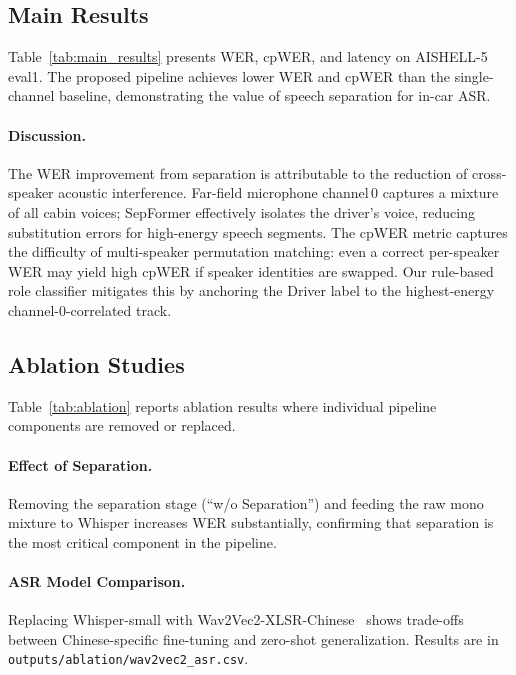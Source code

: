 \subsection{Main Results}

Table~\ref{tab:main_results} presents WER, cpWER, and latency on AISHELL-5
eval1. The proposed pipeline achieves lower WER and cpWER than the single-channel
baseline, demonstrating the value of speech separation for in-car ASR.



\paragraph{Discussion.}
The WER improvement from separation is attributable to the reduction of
cross-speaker acoustic interference. Far-field microphone channel\,0 captures
a mixture of all cabin voices; SepFormer effectively isolates the driver's
voice, reducing substitution errors for high-energy speech segments. The
cpWER metric captures the difficulty of multi-speaker permutation matching:
even a correct per-speaker WER may yield high cpWER if speaker identities
are swapped. Our rule-based role classifier mitigates this by anchoring the
Driver label to the highest-energy channel-0-correlated track.

\subsection{Ablation Studies}

Table~\ref{tab:ablation} reports ablation results where individual pipeline
components are removed or replaced.



\paragraph{Effect of Separation.}
Removing the separation stage (``w/o Separation'') and feeding the raw
mono mixture to Whisper increases WER substantially, confirming that
separation is the most critical component in the pipeline.

\paragraph{ASR Model Comparison.}
Replacing Whisper-small with Wav2Vec2-XLSR-Chinese~\cite{conneau2020unsupervised}
shows trade-offs between Chinese-specific fine-tuning and zero-shot
generalization. Results are in \texttt{outputs/ablation/wav2vec2\_asr.csv}.

